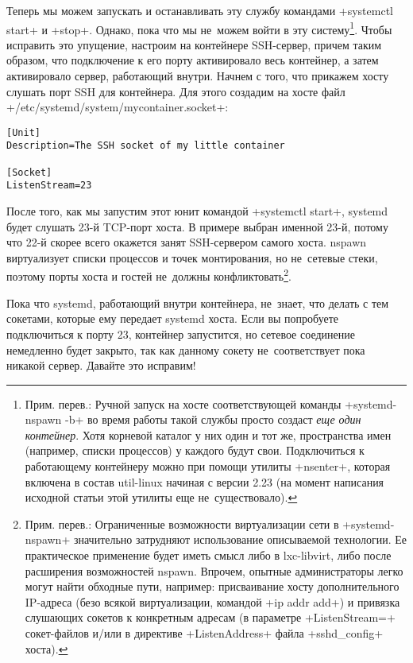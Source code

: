 \documentclass[10pt,oneside,a4paper]{article}
\begin{document}
Теперь мы можем запускать и останавливать эту службу командами +systemctl start+
и +stop+. Однако, пока что мы не~можем войти в эту систему\footnote{Прим.
перев.: Ручной запуск на хосте соответствующей команды +systemd-nspawn -b+ во
время работы такой службы просто создаст \emph{еще один контейнер}. Хотя
корневой каталог у них один и тот же, пространства имен (например, списки
процессов) у каждого будут свои. Подключиться к работающему контейнеру можно при
помощи утилиты +nsenter+, которая включена в состав util-linux начиная с версии
2.23 (на момент написания исходной статьи этой утилиты еще не~существовало).}.
Чтобы исправить это упущение, настроим на контейнере SSH-сервер, причем таким
образом, что подключение к его порту активировало весь контейнер, а затем
активировало сервер, работающий внутри. Начнем с того, что прикажем хосту
слушать порт SSH для контейнера. Для этого создадим на хосте файл
+/etc/systemd/system/mycontainer.socket+:
\begin{Verbatim}
[Unit]
Description=The SSH socket of my little container

[Socket]
ListenStream=23
\end{Verbatim}

После того, как мы запустим этот юнит командой +systemctl start+, systemd будет
слушать 23-й TCP-порт хоста. В примере выбран именной 23-й, потому что 22-й
скорее всего окажется занят SSH-сервером самого хоста. nspawn виртуализует
списки процессов и точек монтирования, но не~сетевые стеки, поэтому порты хоста
и гостей не~должны конфликтовать\footnote{Прим. перев.: Ограниченные возможности
виртуализации сети в +systemd-nspawn+ значительно затрудняют использование
описываемой технологии. Ее практическое применение будет иметь смысл 
либо в lxc-libvirt, либо после расширения возможностей nspawn. Впрочем, опытные
администраторы легко могут найти обходные пути, например: присваивание хосту
дополнительного IP-адреса (безо всякой виртуализации, командой +ip addr add+) и
привязка слушающих сокетов к конкретным адресам (в параметре +ListenStream=+
сокет-файлов и/или в директиве +ListenAddress+ файла +sshd_config+ хоста).}. 

Пока что systemd, работающий внутри контейнера, не~знает, что делать с тем
сокетами, которые ему передает systemd хоста. Если вы попробуете подключиться к
порту 23, контейнер запустится, но сетевое соединение немедленно будет закрыто,
так как данному сокету не~соответствует пока никакой сервер. Давайте это
исправим!
\end{document}
